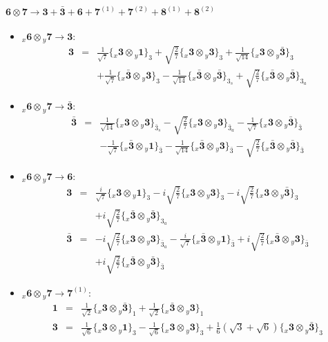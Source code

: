 \documentclass[english]{article}
\newcommand{\rep}[1]{\mathbf{#1}}
\newcommand{\repx}[2]{{}_{#2}\mathbf{#1}}
\newcommand{\subcg}[3]{\big\{ \repx{#1}{x}\otimes\repx{#2}{y}\big\}^{}_{#3}}
\begin{document}
\paragraph*{\Large $\rep{6}\otimes\rep{7}\to\rep{3}+\rep{\bar{3}}+\rep{6}+\rep{7}^{(1)}+\rep{7}^{(2)}+\rep{8}^{(1)}+\rep{8}^{(2)}$}
\begin{itemize}
\item $\repx{6}{x}\otimes\repx{7}{y}\to\rep{3}$:
\begin{eqnarray*}
\rep{3} &=& \frac{1}{\sqrt{7}}\subcg{3}{1}{3}+\sqrt{\frac{2}{7}}\subcg{3}{3}{3}+\frac{1}{\sqrt{14}}\subcg{3}{\bar{3}}{3} \\ 
 & & +\frac{1}{\sqrt{7}}\subcg{\bar{3}}{3}{3}-\frac{1}{\sqrt{14}}\subcg{\bar{3}}{\bar{3}}{3_{s}}+\sqrt{\frac{2}{7}}\subcg{\bar{3}}{\bar{3}}{3_{a}}
\end{eqnarray*}
\item $\repx{6}{x}\otimes\repx{7}{y}\to\rep{\bar{3}}$:
\begin{eqnarray*}
\rep{\bar{3}} &=& \frac{1}{\sqrt{14}}\subcg{3}{3}{\bar{3}_{s}}-\sqrt{\frac{2}{7}}\subcg{3}{3}{\bar{3}_{a}}-\frac{1}{\sqrt{7}}\subcg{3}{\bar{3}}{\bar{3}} \\ 
 & & -\frac{1}{\sqrt{7}}\subcg{\bar{3}}{1}{\bar{3}}-\frac{1}{\sqrt{14}}\subcg{\bar{3}}{3}{\bar{3}}-\sqrt{\frac{2}{7}}\subcg{\bar{3}}{\bar{3}}{\bar{3}}
\end{eqnarray*}
\item $\repx{6}{x}\otimes\repx{7}{y}\to\rep{6}$:
\begin{eqnarray*}
\rep{3} &=& \frac{i}{\sqrt{7}}\subcg{3}{1}{3}-i \sqrt{\frac{2}{7}}\subcg{3}{3}{3}-i \sqrt{\frac{2}{7}}\subcg{3}{\bar{3}}{3} \\ 
 & & +i \sqrt{\frac{2}{7}}\subcg{\bar{3}}{\bar{3}}{3_{a}}
\\
\rep{\bar{3}} &=& -i \sqrt{\frac{2}{7}}\subcg{3}{3}{\bar{3}_{a}}-\frac{i}{\sqrt{7}}\subcg{\bar{3}}{1}{\bar{3}}+i \sqrt{\frac{2}{7}}\subcg{\bar{3}}{3}{\bar{3}} \\ 
 & & +i \sqrt{\frac{2}{7}}\subcg{\bar{3}}{\bar{3}}{\bar{3}}
\end{eqnarray*}
\item $\repx{6}{x}\otimes\repx{7}{y}\to\rep{7}^{(1)}$:
\begin{eqnarray*}
\rep{1} &=& \frac{1}{\sqrt{2}}\subcg{3}{\bar{3}}{1}+\frac{1}{\sqrt{2}}\subcg{\bar{3}}{3}{1}
\\
\rep{3} &=& \frac{1}{\sqrt{6}}\subcg{3}{1}{3}-\frac{1}{\sqrt{6}}\subcg{3}{3}{3}+\frac{1}{6} \left(\sqrt{3}+\sqrt{6}\right)\subcg{3}{\bar{3}}{3} \\ 

\end{eqnarray*}
\end{itemize}
\end{document}
